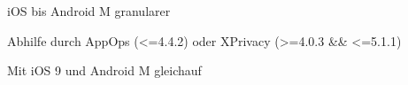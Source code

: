 \begin{frame}
	\begin{block}{}
		iOS bis Android M granularer
	\end{block}
	\begin{block}{}
		Abhilfe durch AppOps (<=4.4.2) oder XPrivacy (>=4.0.3 \&\& <=5.1.1)
	\end{block}
	\begin{block}{}
		Mit iOS 9 und Android M gleichauf
	\end{block}
\end{frame}